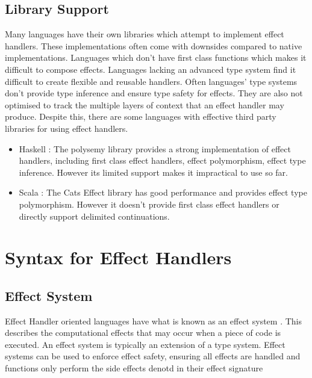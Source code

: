 \documentclass[logo,bsc,singlespacing,parskip]{infthesis}
\begin{document}
\subsection{Library Support}
Many languages have their own libraries which attempt to implement effect handlers. These implementations often come with downsides compared to native implementations. Languages which don’t have first class functions which makes it difficult to compose effects. Languages lacking an advanced type system find it difficult to create flexible and reusable handlers. Often languages’ type systems don’t provide type inference and ensure type safety for effects. They are also not optimised to track the multiple layers of context that an effect handler may produce. Despite this, there are some languages with effective third party libraries for using effect handlers.

\begin{itemize}
    \item Haskell \cite{haskell_effects}: The polysemy library provides a strong implementation of effect handlers, including first class effect handlers, effect polymorphism, effect type inference. However its limited support makes it impractical to use so far.
    \item Scala \cite{scala_effects}: The Cats Effect library has good performance and provides effect type polymorphism. However it doesn’t provide first class effect handlers or directly support delimited continuations.
\end{itemize}

\section{Syntax for Effect Handlers}

\subsection{Effect System}
Effect Handler oriented languages have what is known as an effect system \cite{bauer_effect_2013}. This describes the computational effects that may occur when a piece of code is executed. An effect system is typically an extension of a type system. Effect systems can be used to enforce effect safety, ensuring all effects are handled and functions only perform the side effects denotd in their effect signature



\end{document}
